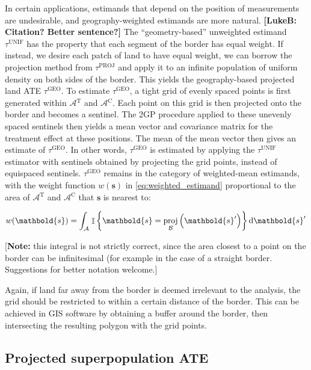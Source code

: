 \documentclass[letter]{article}
\DeclareMathOperator{\Ind}{\mathbb{I}}
\newcommand{\area}{\mathcal{A}}
\newcommand{\treat}{\mathrm{T}}
\newcommand{\ctrol}{\mathrm{C}}
\newcommand{\treatarea}{\area{}^{\treat}}
\newcommand{\ctrolarea}{\area{}^{\ctrol}}
\newcommand{\svec}{\mathbold{s}}
\newcommand{\boundary}{\mathcal{B}}
\newcommand{\unifavg}{\tau^{\mathrm{UNIF}}}
\newcommand{\tauproj}{\tau^{\mathrm{PROJ}}}
\newcommand{\taugeo}{\tau^{\mathrm{GEO}}}
\DeclareMathOperator{\proj}{proj}
\begin{document}
In certain applications, estimands that depend on the position of measurements are undesirable, and geography-weighted estimands are more natural. \textbf{{[}LukeB: Citation? Better sentence?{]}}
The ``geometry-based'' unweighted estimand \(\unifavg\) has the property that each segment of the border has equal weight.
If instead, we desire each patch of land to have equal weight, we can borrow the projection method from \(\tauproj\) and apply it to an infinite population of uniform density on both sides of the border.
This yields the geography-based projected land ATE \(\taugeo\).
To estimate \(\taugeo\), a tight grid of evenly spaced points is first generated within \(\treatarea\) and \(\ctrolarea\).
Each point on this grid is then projected onto the border and becomes a sentinel.
The 2GP procedure applied to these unevenly spaced sentinels then yields a mean vector and covariance matrix for the treatment effect at these positions.
The mean of the mean vector then gives an estimate of \(\taugeo\).
In other words, \(\taugeo\) is estimated by applying the \(\unifavg\) estimator with sentinels obtained by projecting the grid points, instead of equispaced sentinels.
\(\taugeo\) remains in the category of weighted-mean estimands, with the weight function \(w(\svec)\) in \eqref{eq:weighted_estimand} proportional to the area of \(\treatarea\) and \(\ctrolarea\) that \(\svec\) is nearest to:

\begin{equation}
w(\svec) = \int_{\area} \left. \Ind \cbr{\svec = \proj_{\boundary}\del{\svec'}} \dif \svec' \right.
\end{equation}

{[}\textbf{Note:} this integral is not strictly correct, since the area closest to a point on the border can be infinitesimal (for example in the case of a straight border. Suggestions for better notation welcome.{]}

Again, if land far away from the border is deemed irrelevant to the analysis, the grid should be restricted to within a certain distance of the border.
This can be achieved in GIS software by obtaining a buffer around the border, then intersecting the resulting polygon with the grid points.
    


    	\subsection{Projected superpopulation ATE}\label{projected-superpopulation-ate}
\end{document}
